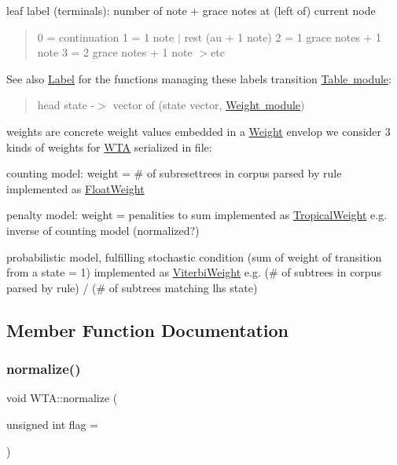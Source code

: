 leaf label (terminals)\+: number of note + grace notes at (left of) current node \begin{quote}
0 = continuation 1 = 1 note $\vert$ rest (au + 1 note) 2 = 1 grace notes + 1 note 3 = 2 grace notes + 1 note $>$etc \end{quote}
\begin{DoxySeeAlso}{See also}
\mbox{\hyperlink{classLabel}{Label}} for the functions managing these labels transition \mbox{\hyperlink{group__table}{Table module}}\+: \begin{quote}
head state -\/$>$ vector of (state vector, \mbox{\hyperlink{group__weight}{Weight module}}) \end{quote}

\end{DoxySeeAlso}
weights are concrete weight values embedded in a \mbox{\hyperlink{classWeight}{Weight}} envelop we consider 3 kinds of weights for \mbox{\hyperlink{classWTA}{W\+TA}} serialized in file\+:
\begin{DoxyItemize}
\item counting model\+: weight = \# of subresettrees in corpus parsed by rule implemented as \mbox{\hyperlink{classFloatWeight}{Float\+Weight}}
\item penalty model\+: weight = penalities to sum implemented as \mbox{\hyperlink{classTropicalWeight}{Tropical\+Weight}} e.\+g. inverse of counting model (normalized?)
\item probabilistic model, fulfilling stochastic condition (sum of weight of transition from a state = 1) implemented as \mbox{\hyperlink{classViterbiWeight}{Viterbi\+Weight}} e.\+g. (\# of subtrees in corpus parsed by rule) / (\# of subtrees matching lhs state) 
\end{DoxyItemize}

\subsection{Member Function Documentation}
\mbox{\label{classWTA_aa4eda8d626af33674c59fef22c8220c1}} 
\subsubsection{\texorpdfstring{normalize()}{normalize()}}
{\footnotesize\ttfamily void W\+T\+A\+::normalize (\begin{DoxyParamCaption}\item[{unsigned int}]{flag = {} }\end{DoxyParamCaption})}



